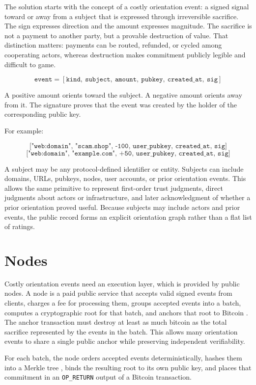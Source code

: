 \documentclass[11pt]{article}
\begin{document}
The solution starts with the concept of a costly orientation event: a signed signal toward or away from a subject that is expressed through irreversible sacrifice. The sign expresses direction and the amount expresses magnitude. The sacrifice is not a payment to another party, but a provable destruction of value. That distinction matters: payments can be routed, refunded, or cycled among cooperating actors, whereas destruction makes commitment publicly legible and difficult to game.

\[
\texttt{event} =
[\texttt{kind},\ \texttt{subject},\ \texttt{amount},\ \texttt{pubkey},\ \texttt{created\_at},\ \texttt{sig}]
\]

A positive amount orients toward the subject. A negative amount orients away from it. The signature proves that the event was created by the holder of the corresponding public key.

For example:

\[
\texttt{["web:domain", "scam.shop", -100, user\_pubkey, created\_at, sig]}
\]
\[
\texttt{["web:domain", "example.com", +50, user\_pubkey, created\_at, sig]}
\]

A subject may be any protocol-defined identifier or entity. Subjects can include domains, URLs, pubkeys, nodes, user accounts, or prior orientation events. This allows the same primitive to represent first-order trust judgments, direct judgments about actors or infrastructure, and later acknowledgment of whether a prior orientation proved useful. Because subjects may include actors and prior events, the public record forms an explicit orientation graph rather than a flat list of ratings.

\section{Nodes}

Costly orientation events need an execution layer, which is provided by public nodes. A node is a paid public service that accepts valid signed events from clients, charges a fee for processing them, groups accepted events into a batch, computes a cryptographic root for that batch, and anchors that root to Bitcoin \cite{nakamoto2008bitcoin}. The anchor transaction must destroy at least as much bitcoin as the total sacrifice represented by the events in the batch. This allows many orientation events to share a single public anchor while preserving independent verifiability.

For each batch, the node orders accepted events deterministically, hashes them into a Merkle tree \cite{merkle1987digital}, binds the resulting root to its own public key, and places that commitment in an \texttt{OP\_RETURN} output of a Bitcoin transaction.
\end{document}
